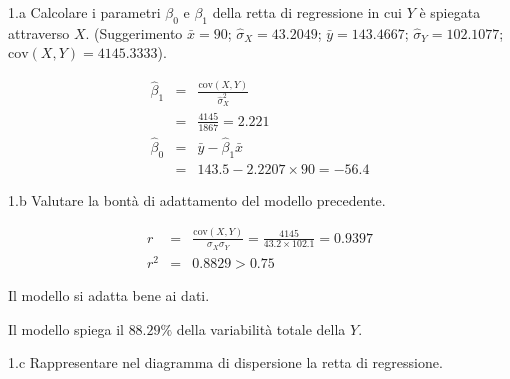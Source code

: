 \documentclass[
  11pt,
]{book}
\theoremstyle{mytheoremstyle}
\theoremstyle{mydefstyle}
\newenvironment{sol}
  {
  \begin{tcolorbox}[enhanced,breakable,arc=0.1mm,boxrule=1pt,colback=white,colframe=iblue,
  title=\bf \fontfamily{lmss}\selectfont \hspace{.5 cm} Soluzione,drop fuzzy shadow]

}{
\end{tcolorbox}
  }
\begin{document}
1.a Calcolare i parametri \(\beta_{0}\) e \(\beta_{1}\)
della retta di regressione in cui \(Y\) è spiegata attraverso \(X\).
(Suggerimento \(\bar{x} = 90\); \(\hat\sigma_{X} = 43.2049\);
\(\bar{y} = 143.4667\); \(\hat\sigma_{Y} = 102.1077\); \(\text{cov}(X,Y)= 4145.3333\)).

\begin{sol}
\begin{eqnarray*}
       \hat\beta_1 &=& \frac{\text{cov}(X,Y)}{\hat\sigma_X^2} \\
            &=& \frac{ 4145 }{ 1867 }  =  2.221 \\
      \hat\beta_0 &=& \bar y - \hat\beta_1 \bar x\\
          &=&  143.5 - 2.2207 \times  90 = -56.4 
      \end{eqnarray*}

\end{sol}

1.b Valutare la bontà di adattamento del modello precedente.

\begin{sol}
\begin{eqnarray*}
r&=&\frac{\text{cov}(X,Y)}{\sigma_X\sigma_Y}=\frac{ 4145 }{ 43.2 \times 102.1 }= 0.9397 \\ 
r^2&=& 0.8829 > 0.75
\end{eqnarray*}

Il modello si adatta bene ai dati.

Il modello spiega il \(88.29\%\) della variabilità totale della \(Y\).

\end{sol}

1.c Rappresentare nel diagramma di dispersione la retta di regressione.
\end{document}
